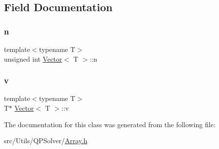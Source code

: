 \subsection{Field Documentation}
\mbox{\label{classVector_adab11fd27ce9e960aa8612937e453786_adab11fd27ce9e960aa8612937e453786}} 
\subsubsection{\texorpdfstring{n}{n}}
{\footnotesize\ttfamily template$<$typename T$>$ \\
unsigned int \mbox{\hyperlink{classVector}{Vector}}$<$ T $>$\+::n\hspace{0.3cm}{\ttfamily [private]}}

\mbox{\label{classVector_ab72db1fed2b2310123729b1fd76d3446_ab72db1fed2b2310123729b1fd76d3446}} 
\subsubsection{\texorpdfstring{v}{v}}
{\footnotesize\ttfamily template$<$typename T$>$ \\
T$\ast$ \mbox{\hyperlink{classVector}{Vector}}$<$ T $>$\+::v\hspace{0.3cm}{\ttfamily [private]}}



The documentation for this class was generated from the following file\+:\begin{DoxyCompactItemize}
\item 
src/\+Utils/\+Q\+P\+Solver/\mbox{\hyperlink{Array_8h}{Array.\+h}}\end{DoxyCompactItemize}
